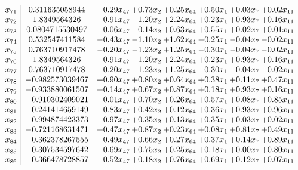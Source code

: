 \documentclass[8pt]{article}
\begin{document}
\[\begin{array}{c| c c@{\hskip 2pt} c@{\hskip 2pt} c@{\hskip 2pt} c@{\hskip 2pt} c@{\hskip 2pt} c@{\hskip 2pt} }
 x_{71}   &  0.311635058944 & +  0.29 x_{47} & +  0.73 x_{2} & +  0.25 x_{64} & +  0.50 x_{1} & +  0.03 x_{7} & +  0.02 x_{11}\\
 x_{72}   &  1.8349564326 & +  0.91 x_{47} & -1.20 x_{2} & +  2.24 x_{64} & +  0.23 x_{1} & +  0.93 x_{7} & +  0.16 x_{11}\\
 x_{73}   &  0.0804715530497 & +  0.06 x_{47} & -0.14 x_{2} & +  0.63 x_{64} & +  0.55 x_{1} & +  0.02 x_{7} & +  0.01 x_{11}\\
 x_{74}   &  0.532547411584 & -0.43 x_{47} & -1.10 x_{2} & +  1.62 x_{64} & -0.25 x_{1} & -0.04 x_{7} & -0.02 x_{11}\\
 x_{75}   &  0.763710917478 & -0.20 x_{47} & -1.23 x_{2} & +  1.25 x_{64} & -0.30 x_{1} & -0.04 x_{7} & -0.02 x_{11}\\
 x_{76}   &  1.8349564326 & +  0.91 x_{47} & -1.20 x_{2} & +  2.24 x_{64} & +  0.23 x_{1} & +  0.93 x_{7} & +  0.16 x_{11}\\
 x_{77}   &  0.763710917478 & -0.20 x_{47} & -1.23 x_{2} & +  1.25 x_{64} & -0.30 x_{1} & -0.04 x_{7} & -0.02 x_{11}\\
 x_{78}   &  -0.982573039467 & +  0.90 x_{47} & +  0.80 x_{2} & +  0.64 x_{64} & +  0.38 x_{1} & +  0.11 x_{7} & +  0.47 x_{11}\\
 x_{79}   &  -0.933880061507 & +  0.14 x_{47} & +  0.67 x_{2} & +  0.87 x_{64} & +  0.18 x_{1} & +  0.93 x_{7} & +  0.16 x_{11}\\
 x_{80}   &  -0.910302409021 & +  0.01 x_{47} & +  0.70 x_{2} & +  0.26 x_{64} & +  0.57 x_{1} & +  0.08 x_{7} & +  0.85 x_{11}\\
 x_{81}   &  -0.241414659149 & +  0.83 x_{47} & +  0.42 x_{2} & +  0.12 x_{64} & +  0.36 x_{1} & +  0.93 x_{7} & +  0.96 x_{11}\\
 x_{82}   &  -0.994874423373 & +  0.97 x_{47} & +  0.35 x_{2} & +  0.13 x_{64} & +  0.35 x_{1} & +  0.03 x_{7} & +  0.02 x_{11}\\
 x_{83}   &  -0.721168631471 & +  0.47 x_{47} & +  0.87 x_{2} & +  0.23 x_{64} & +  0.08 x_{1} & +  0.81 x_{7} & +  0.49 x_{11}\\
 x_{84}   &  -0.362378267555 & +  0.49 x_{47} & +  0.66 x_{2} & +  0.27 x_{64} & +  0.37 x_{1} & +  0.14 x_{7} & +  0.89 x_{11}\\
 x_{85}   &  -0.307534597642 & +  0.69 x_{47} & +  0.75 x_{2} & +  0.25 x_{64} & +  0.18 x_{1} & +  0.00 x_{7} & +  0.80 x_{11}\\
 x_{86}   &  -0.366478728857 & +  0.52 x_{47} & +  0.18 x_{2} & +  0.76 x_{64} & +  0.69 x_{1} & +  0.12 x_{7} & +  0.07 x_{11}\\

\end{array}\]
\end{document}
